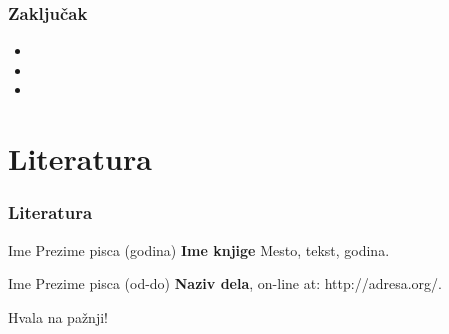 \documentclass{beamer}
\begin{document}
\begin{frame}
\frametitle{Zaključak}

\begin{itemize}
\item
\item
\item
\end{itemize}

\end{frame}


\section{Literatura}

\begin{frame}
\frametitle{Literatura}
\footnotesize{
\begin{thebibliography}{99}

 Ime Prezime pisca (godina)
\newblock \small{\textbf{Ime knjige} Mesto, tekst, godina.}

 Ime Prezime pisca (od-do)
\newblock \small{\textbf{Naziv dela}, on-line at: http://adresa.org/.}

\end{thebibliography}
}

\end{frame}

\begin{frame}
\Huge{\centerline{Hvala na pažnji!}}
\end{frame}
\end{document}
